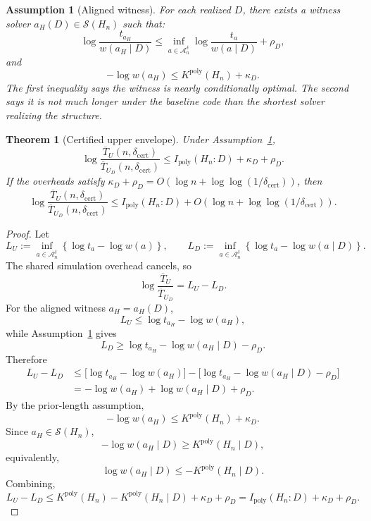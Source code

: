 \documentclass{article}
\newtheorem{assumption}{Assumption}
\newtheorem{theorem}{Theorem}
\newcommand{\cA}{\mathcal{A}}
\newcommand{\cS}{\mathcal{S}}
\begin{document}
\begin{assumption}[Aligned witness]
\label{ass:app-aligned-witness}
For each realized \(D\), there exists a witness solver \(a_H(D)\in\cS(H_n)\) such that:
\[
    \log\frac{t_{a_H}}{w(a_H\mid D)}
    \le
    \inf_{a\in\cA_n^\delta}
    \log\frac{t_a}{w(a\mid D)}
    +
    \rho_D ,
\]
and
\[
    -\log w(a_H)
    \le
    K^{\mathrm{poly}}(H_n)+\kappa_D .
\]
The first inequality says the witness is nearly conditionally optimal.
The second says it is not much longer under the baseline code than the shortest solver
realizing the structure.
\end{assumption}

\begin{theorem}[Certified upper envelope]
\label{thm:app-certified-upper-envelope}
Under Assumption~\ref{ass:app-aligned-witness},
\[
    \log\frac{\overline T_U(n,\delta_{\mathrm{cert}})}
             {\overline T_{U_D}(n,\delta_{\mathrm{cert}})}
    \le
    I_{\mathrm{poly}}(H_n:D)+\kappa_D+\rho_D .
\]
If the overheads satisfy \(\kappa_D+\rho_D=O(\log n+\log\log(1/\delta_{\mathrm{cert}}))\),
then
\[
    \log\frac{\overline T_U(n,\delta_{\mathrm{cert}})}
             {\overline T_{U_D}(n,\delta_{\mathrm{cert}})}
    \le
    I_{\mathrm{poly}}(H_n:D)
    +
    O(\log n+\log\log(1/\delta_{\mathrm{cert}})).
\]
\end{theorem}

\begin{proof}
Let
\[
    L_U:=\inf_{a\in\cA_n^\delta}\left\{\log t_a-\log w(a)\right\},
    \qquad
    L_D:=\inf_{a\in\cA_n^\delta}\left\{\log t_a-\log w(a\mid D)\right\}.
\]
The shared simulation overhead cancels, so
\[
    \log\frac{\overline T_U}{\overline T_{U_D}}
    =
    L_U-L_D.
\]
For the aligned witness \(a_H=a_H(D)\),
\[
    L_U
    \le
    \log t_{a_H}-\log w(a_H),
\]
while Assumption~\ref{ass:app-aligned-witness} gives
\[
    L_D
    \ge
    \log t_{a_H}-\log w(a_H\mid D)-\rho_D.
\]
Therefore
\[
\begin{aligned}
    L_U-L_D
    &\le
    \bigl[\log t_{a_H}-\log w(a_H)\bigr]
    -
    \bigl[\log t_{a_H}-\log w(a_H\mid D)-\rho_D\bigr]
    \\
    &=
    -\log w(a_H)+\log w(a_H\mid D)+\rho_D.
\end{aligned}
\]
By the prior-length assumption,
\[
    -\log w(a_H)\le K^{\mathrm{poly}}(H_n)+\kappa_D.
\]
Since \(a_H\in\cS(H_n)\),
\[
    -\log w(a_H\mid D)\ge K^{\mathrm{poly}}(H_n\mid D),
\]
equivalently,
\[
    \log w(a_H\mid D)\le -K^{\mathrm{poly}}(H_n\mid D).
\]
Combining,
\[
    L_U-L_D
    \le
    K^{\mathrm{poly}}(H_n)-K^{\mathrm{poly}}(H_n\mid D)+\kappa_D+\rho_D
    =
    I_{\mathrm{poly}}(H_n:D)+\kappa_D+\rho_D .
\]
\end{proof}
\end{document}
